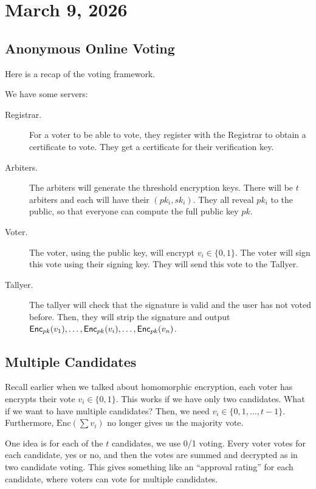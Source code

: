 \section{March 9, 2026}

\label{20260309}

\subsection{Anonymous Online Voting}

Here is a recap of the voting framework.

We have some servers:
\begin{description}
    \item[Registrar.] For a voter to be able to vote, they register with the Registrar to obtain a certificate to vote. They get a certificate for their verification key.
    \item[Arbiters.] The arbiters will generate the threshold encryption keys. There will be $t$ arbiters and each will have their $(pk_i, sk_i)$. They all reveal $pk_i$ to the public, so that everyone can compute the full public key $pk$.
    \item[Voter.] The voter, using the public key, will encrypt $v_i \in\{0, 1\}$. The voter will sign this vote using their signing key. They will send this vote to the Tallyer.
    \item[Tallyer.] The tallyer will check that the signature is valid and the user has not voted before. Then, they will strip the signature and output $\operatorname{\mathsf{Enc}}_{pk}(v_1), \dots, \operatorname{\mathsf{Enc}}_{pk}(v_i), \dots, \operatorname{\mathsf{Enc}}_{pk}(v_n)$.
\end{description}

\subsection{Multiple Candidates}

Recall earlier when we talked about homomorphic encryption, each voter has encrypts their vote $v_i \in \{0, 1\}$. This works if we have only two candidates. What if we want to have multiple candidates? Then, we need $v_i \in \{0, 1, \dots, t-1\}$. Furthermore, $\text{Enc}(\sum v_i)$ no longer gives us the majority vote.

One idea is for each of the $t$ candidates, we use 0/1 voting. Every voter votes for each candidate, yes or no, and then the votes are summed and decrypted as in two candidate voting. This gives something like an ``approval rating'' for each candidate, where voters can vote for multiple candidates.

